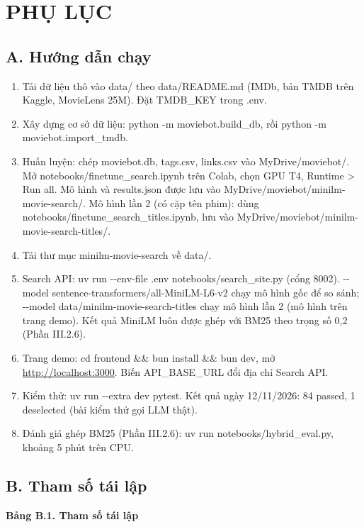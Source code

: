 \documentclass[12pt,a4paper]{article}
\newcommand{\npp}{\Needspace{13\baselineskip}}
\let\oldsubsection\subsection
\renewcommand{\subsection}{\Needspace{12\baselineskip}\oldsubsection}
\newcommand{\chap}[1]{\clearpage\section{#1}}
\begin{document}
\chap{PHỤ LỤC}

\subsection{A. Hướng dẫn chạy}

\begin{enumerate}
\def\labelenumi{\arabic{enumi}.}
\item Tải dữ liệu thô vào data/ theo data/README.md (IMDb, bản TMDB trên Kaggle, MovieLens 25M). Đặt TMDB\_KEY trong .env.
\item Xây dựng cơ sở dữ liệu: python -m moviebot.build\_db, rồi python -m moviebot.import\_tmdb.
\item Huấn luyện: chép moviebot.db, tags.csv, links.csv vào MyDrive/moviebot/. Mở notebooks/finetune\_search.ipynb trên Colab, chọn GPU T4, Runtime \textgreater{} Run all. Mô hình và results.json được lưu vào MyDrive/moviebot/minilm-movie-search/. Mô hình lần 2 (có cặp tên phim): dùng notebooks/finetune\_search\_titles.ipynb, lưu vào MyDrive/moviebot/minilm-movie-search-titles/.
\item Tải thư mục minilm-movie-search về data/.
\item Search API: uv run -\/-env-file .env notebooks/search\_site.py (cổng 8002). -\/-model sentence-transformers/all-MiniLM-L6-v2 chạy mô hình gốc để so sánh; -\/-model data/minilm-movie-search-titles chạy mô hình lần 2 (mô hình trên trang demo). Kết quả MiniLM luôn được ghép với BM25 theo trọng số 0,2 (Phần III.2.6).
\item Trang demo: cd frontend \&\& bun install \&\& bun dev, mở \href{http://localhost:3000/}{http://localhost:3000}. Biến API\_BASE\_URL đổi địa chỉ Search API.
\item Kiểm thử: uv run -\/-extra dev pytest. Kết quả ngày 12/11/2026: 84 passed, 1 deselected (bài kiểm thử gọi LLM thật).
\item Đánh giá ghép BM25 (Phần III.2.6): uv run notebooks/hybrid\_eval.py, khoảng 5 phút trên CPU.
\end{enumerate}

\subsection{B. Tham số tái lập}

\npp\textbf{Bảng B.1. Tham số tái lập}
\end{document}
